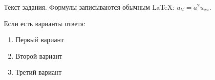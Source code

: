 Текст задания. Формулы записываются обычным LaTeX: \(u_{tt}=a^2u_{xx}\).

Если есть варианты ответа:
\begin{enumerate}[label=\arabic*)]
    \item Первый вариант
    \item Второй вариант
    \item Третий вариант
\end{enumerate}

